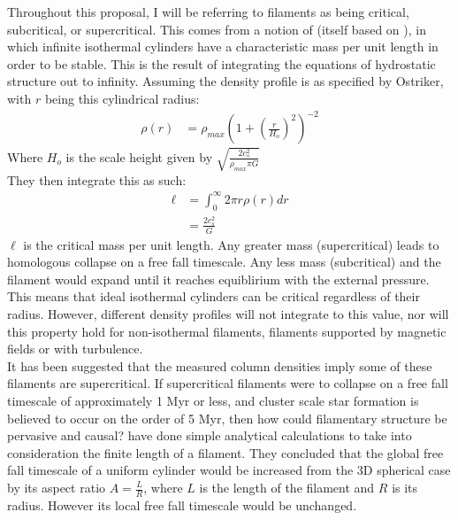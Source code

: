 \documentclass[a4paper,12pt]{article}
\begin{document}
Throughout this proposal, I will be referring to filaments as being critical, subcritical, or supercritical. This comes from a notion of \cite{im92} (itself based on \cite{ost64}), in which infinite isothermal cylinders have a characteristic mass per unit length in order to be stable. This is the result of integrating the equations of hydrostatic structure out to infinity. Assuming the density profile is as specified by Ostriker, with $r$ being this cylindrical radius:
\begin{align*}
\rho(r) &= \rho_{max} \left(1 + \left(\frac{r}{H_o}\right)^2\right)^{-2}
\end{align*} Where $H_o$ is the scale height given by $\sqrt{\frac{2c_s^2}{\rho_{max} \pi G}}$\\
They then integrate this as such:
\begin{align*}
\ell&= \int_0^\infty 2\pi r \rho(r) dr\\
	&= \frac{2c_s^2}{G}
\end{align*} $\ell$ is the critical mass per unit length. Any greater mass (supercritical) leads to homologous collapse on a free fall timescale. Any less mass (subcritical) and the filament would expand until it reaches equiblirium with the external pressure. This means that ideal isothermal cylinders can be critical regardless of their radius. However, different density profiles will not integrate to this value, nor will this property hold for non-isothermal filaments, filaments supported by magnetic fields or with turbulence.\\

It has been suggested \citep{pal13} %
that the measured column densities imply some of these filaments are supercritical. If supercritical filaments were to collapse on a free fall timescale of approximately 1 Myr or less, and cluster scale star formation is believed to occur on the order of 5 Myr, then how could filamentary structure be pervasive and causal? \cite{tvg12} have done simple analytical calculations to take into consideration the finite length of a filament. They concluded that the global free fall timescale of a uniform cylinder would be increased from the 3D spherical case by its aspect ratio $A=\frac{L}{R}$, where $L$ is the length of the filament and $R$ is its radius. However its local free fall timescale would be unchanged.\\ %
\end{document}
